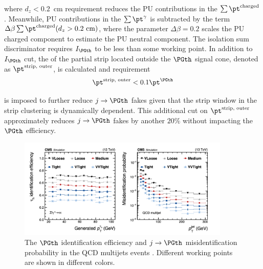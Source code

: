 \noindent where $d_z<0.2$~cm requirement reduces the PU contributions in the $\sum \pt^{\text{charged}}$. Meanwhile, PU contributions in the $\sum \pt^ \gamma $ is subtracted by the term $\Delta \beta \sum \pt^{\text{charged}} (d_z>0.2~\text{cm}) $, where the parameter $\Delta \beta =0.2$ scales the PU charged component to estimate the PU neutral component. The isolation sum discriminator requires $I_{\PGth} $ to be less than some working point. In addition to $I_{\PGth}$ cut, the \pt of the partial strip located outside the $\PGth$ signal cone, denoted as $\pt^{\text{strip, outer}} $, is calculated and requirement
\begin{equation}
    \pt^{\text{strip, outer}} < 0.1 \pt^{\PGth}
    \label{eqn:cmsexperiment:reconstruction:ptStripOuter}
\end{equation}

\noindent is imposed to further reduce $j \to \PGth$ fakes given that the strip window in the strip clustering is dynamically \pt dependent. This additional cut on $\pt^{\text{strip, outer}}$ approximately reduces $j \to \PGth$ fakes by another $20\%$ without impacting the $\PGth$ efficiency.


\begin{figure}[ht]
    \centering
    \includegraphics[width=0.9\textwidth]{chapters/CMSExperiment/sectionReconstruction/figures/tauMVA}
    \caption{ The $\PGth$ identification efficiency and $j\to \PGth$ misidentification probability in the QCD multijets events \cite{Sirunyan:2018pgf}. Different working points are shown in different colors. }
    \label{fig:cmsexperiment:reconstruction:tauMVA}
\end{figure}



